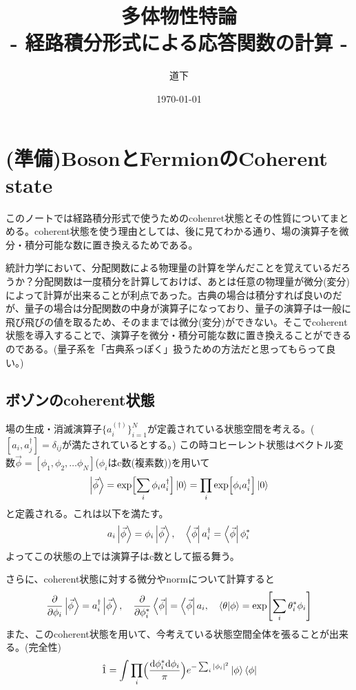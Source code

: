 \documentclass[a4paper,12pt]{jsarticle}
\title{多体物性特論\\ - 経路積分形式による応答関数の計算 -}
\author{道下}
\date{\today}
\newcommand{\p}{\partial}
\newcommand{\poi}[1]{\{ #1 \}}
\newcommand{\Biglr}[1]{\Bigl[ #1 \Bigr]}
\begin{document}
\maketitle

\setcounter{tocdepth}{2}
\tableofcontents

\section{(準備)BosonとFermionのCoherent state}
このノートでは経路積分形式で使うためのcohenret状態とその性質についてまとめる。coherent状態を使う理由としては、後に見てわかる通り、場の演算子を微分・積分可能な数に置き換えるためである。

統計力学において、分配関数による物理量の計算を学んだことを覚えているだろうか？分配関数は一度積分を計算しておけば、あとは任意の物理量が微分(変分)によって計算が出来ることが利点であった。古典の場合は積分すれば良いのだが、量子の場合は分配関数の中身が演算子になっており、量子の演算子は一般に飛び飛びの値を取るため、そのままでは微分(変分)ができない。そこでcoherent状態を導入することで、演算子を微分・積分可能な数に置き換えることができるのである。(量子系を「古典系っぽく」扱うための方法だと思ってもらって良い。)

\subsection{ボゾンのcoherent状態}
場の生成・消滅演算子$\poi{a^{(\dagger)}_i}_{i=1}^N$が定義されている状態空間を考える。($[a_i, a_j^\dagger] = \delta_{ij}$が満たされているとする。)
この時コヒーレント状態はベクトル変数$\vec{\phi} = [\phi_1, \phi_2, \dots \phi_N]$($\phi_i$はc数(複素数))を用いて
\begin{eqnarray}
  \ket{\vec{\phi}} = \exp\Biglr{\sum_i \phi_i a_i^\dagger}\ket{0} = \prod_i \exp\Biglr{\phi_i a_i^\dagger}\ket{0}
\end{eqnarray}
と定義される。これは以下を満たす。
\begin{eqnarray}
  a_i \ket{\vec{\phi}} = \phi_i \ket{\vec{\phi}}, \quad \bra{\vec{\phi}} a_i^\dagger = \bra{\vec{\phi}} \phi_i^* \label{coherent_eigen}
\end{eqnarray}
よってこの状態の上では演算子はc数として振る舞う。


さらに、coherent状態に対する微分やnormについて計算すると
\begin{eqnarray}
  \frac{\p}{\p \phi_i} \ket{\vec{\phi}} = a^{\dagger}_i \ket{\vec{\phi}}, \quad \frac{\p}{\p \phi^*_i} \bra{\vec{\phi}} = \bra{\vec{\phi}} a_i, \quad \braket{\theta}{\phi} = \exp[\sum_i \theta_i^*\phi_i] \label{coh_norm}
\end{eqnarray}
また、このcoherent状態を用いて、今考えている状態空間全体を張ることが出来る。(完全性)
\begin{eqnarray}
  \hat{1} = \int \prod_i \Bigl(\frac{\mathrm{d}\phi_i^*\mathrm{d}\phi_i}{\pi}\Bigr) e^{-\sum_i |\phi_i|^2} \ket{\phi}\bra{\phi}
\end{eqnarray}
\end{document}
